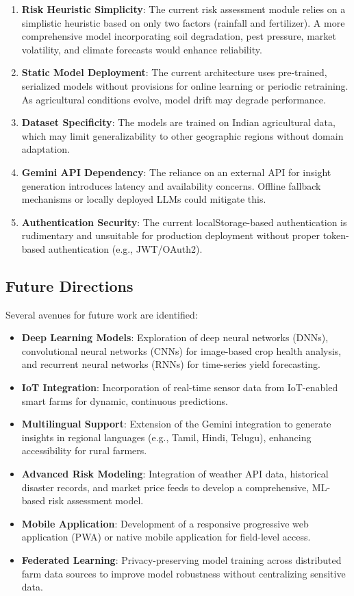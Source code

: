 \begin{enumerate}
    \item \textbf{Risk Heuristic Simplicity}: The current risk assessment module relies on a simplistic heuristic based on only two factors (rainfall and fertilizer). A more comprehensive model incorporating soil degradation, pest pressure, market volatility, and climate forecasts would enhance reliability.
    \item \textbf{Static Model Deployment}: The current architecture uses pre-trained, serialized models without provisions for online learning or periodic retraining. As agricultural conditions evolve, model drift may degrade performance.
    \item \textbf{Dataset Specificity}: The models are trained on Indian agricultural data, which may limit generalizability to other geographic regions without domain adaptation.
    \item \textbf{Gemini API Dependency}: The reliance on an external API for insight generation introduces latency and availability concerns. Offline fallback mechanisms or locally deployed LLMs could mitigate this.
    \item \textbf{Authentication Security}: The current localStorage-based authentication is rudimentary and unsuitable for production deployment without proper token-based authentication (e.g., JWT/OAuth2).
\end{enumerate}

\subsection{Future Directions}
Several avenues for future work are identified:

\begin{itemize}
    \item \textbf{Deep Learning Models}: Exploration of deep neural networks (DNNs), convolutional neural networks (CNNs) for image-based crop health analysis, and recurrent neural networks (RNNs) for time-series yield forecasting.
    \item \textbf{IoT Integration}: Incorporation of real-time sensor data from IoT-enabled smart farms for dynamic, continuous predictions.
    \item \textbf{Multilingual Support}: Extension of the Gemini integration to generate insights in regional languages (e.g., Tamil, Hindi, Telugu), enhancing accessibility for rural farmers.
    \item \textbf{Advanced Risk Modeling}: Integration of weather API data, historical disaster records, and market price feeds to develop a comprehensive, ML-based risk assessment model.
    \item \textbf{Mobile Application}: Development of a responsive progressive web application (PWA) or native mobile application for field-level access.
    \item \textbf{Federated Learning}: Privacy-preserving model training across distributed farm data sources to improve model robustness without centralizing sensitive data.
\end{itemize}
